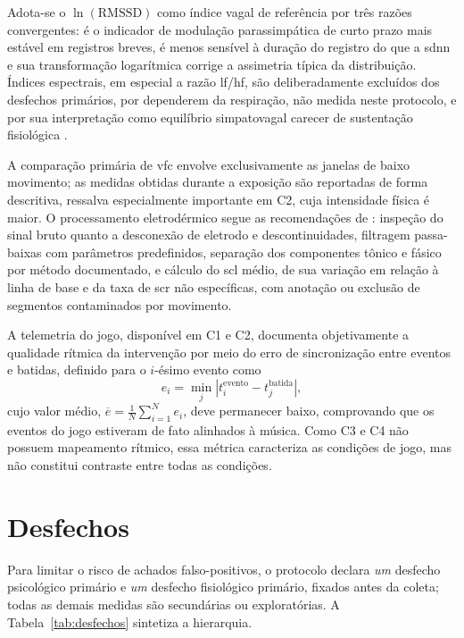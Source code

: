 Adota-se o $\ln(\mathrm{RMSSD})$ como índice vagal de referência por três razões convergentes: é o indicador de modulação parassimpática de curto prazo mais estável em registros breves, é menos sensível à duração do registro do que a \gls{sdnn} e sua transformação logarítmica corrige a assimetria típica da distribuição. Índices espectrais, em especial a razão \gls{lf}/\gls{hf}, são deliberadamente excluídos dos desfechos primários, por dependerem da respiração, não medida neste protocolo, e por sua interpretação como equilíbrio simpatovagal carecer de sustentação fisiológica \citep{Billman2013}.

A comparação primária de \gls{vfc} envolve exclusivamente as janelas de baixo movimento; as medidas obtidas durante a exposição são reportadas de forma descritiva, ressalva especialmente importante em C2, cuja intensidade física é maior. O processamento eletrodérmico segue as recomendações de \citet{Boucsein2012}: inspeção do sinal bruto quanto a desconexão de eletrodo e descontinuidades, filtragem passa-baixas com parâmetros predefinidos, separação dos componentes tônico e fásico por método documentado, e cálculo do \gls{scl} médio, de sua variação em relação à linha de base e da taxa de \gls{scr} não específicas, com anotação ou exclusão de segmentos contaminados por movimento.

A telemetria do jogo, disponível em C1 e C2, documenta objetivamente a qualidade rítmica da intervenção por meio do erro de sincronização entre eventos e batidas, definido para o $i$-ésimo evento como
\begin{equation}
    e_i = \min_j \left| t_i^{\mathrm{evento}} - t_j^{\mathrm{batida}} \right|,
    \label{eq:sinc}
\end{equation}
\noindent cujo valor médio, $\overline{e} = \frac{1}{N}\sum_{i=1}^{N} e_i$, deve permanecer baixo, comprovando que os eventos do jogo estiveram de fato alinhados à música. Como C3 e C4 não possuem mapeamento rítmico, essa métrica caracteriza as condições de jogo, mas não constitui contraste entre todas as condições.

\section{Desfechos}\label{sec:desfechos}

Para limitar o risco de achados falso-positivos, o protocolo declara \emph{um} desfecho psicológico primário e \emph{um} desfecho fisiológico primário, fixados antes da coleta; todas as demais medidas são secundárias ou exploratórias. A Tabela~\ref{tab:desfechos} sintetiza a hierarquia.

